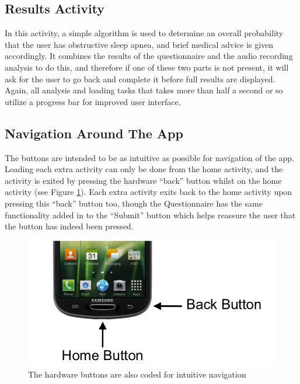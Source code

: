 \subsection{Results Activity}
In this activity, a simple algorithm is used to determine an overall probability that the user has obstructive sleep apnea, and brief medical advice is given accordingly. It combines the results of the questionnaire and the audio recording analysis to do this, and therefore if one of these two parts is not present, it will ask for the user to go back and complete it before full results are displayed. Again, all analysis and loading tasks that takes more than half a second or so utilize a progress bar for improved user interface.
\subsection{Navigation Around The App}
The buttons are intended to be as intuitive as possible for navigation of the app. Loading each extra activity can only be done from the home activity, and the activity is exited by pressing the hardware ``back'' button whilst on the home activity (see Figure \ref{fig:nativeButtons}). Each extra activity exits back to the home activity upon pressing this ``back'' button too, though the Questionnaire has the same functionality added in to the ``Submit'' button which helps reassure the user that the button has indeed been pressed.
\begin{figure}[ht!]
		\centering
			\includegraphics[width=.5\textwidth]{drawings/android_buttons.png}
		\caption{The hardware buttons are also coded for intuitive navigation}
		\label{fig:nativeButtons}
	\end{figure}